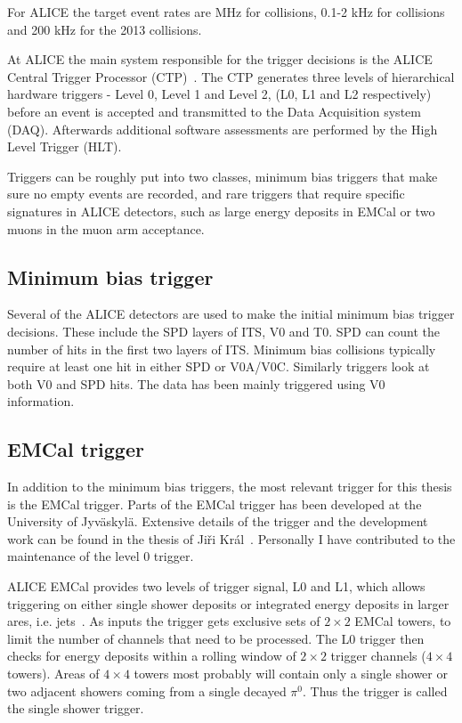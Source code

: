 For ALICE the target event rates are \unit[1]{MHz} for \pp collisions, 0.1-2 \unit{kHz} for \PbPb collisions and 200 \unit{kHz} for the 2013 \pPb collisions.

At ALICE the main system responsible for the trigger decisions is the ALICE Central Trigger Processor (CTP)~\cite{Krivda:2016myl}. The CTP generates three levels of hierarchical hardware triggers - Level 0, Level 1 and Level 2, (L0, L1 and L2 respectively) before an event is accepted and transmitted to the Data Acquisition system (DAQ). Afterwards additional software assessments are performed by the High Level Trigger (HLT).

Triggers can be roughly put into two classes, minimum bias triggers that make sure no empty events are recorded, and rare triggers that require specific signatures in ALICE detectors, such as large energy deposits in EMCal or two muons in the muon arm acceptance.

\subsection*{Minimum bias trigger}
Several of the ALICE detectors are used to make the initial minimum bias trigger decisions. These include the SPD layers of ITS, V0 and T0. SPD can count the number of hits in the first two layers of ITS. Minimum bias \pp collisions typically require at least one hit in either SPD or V0A/V0C. Similarly \PbPb triggers look at both V0 and SPD hits. The \pPb data has been mainly triggered using V0 information.


\subsection*{EMCal trigger}
In addition to the minimum bias triggers, the most relevant trigger for this thesis is the EMCal trigger. Parts of the EMCal trigger has been developed at the University of Jyväskylä. Extensive details of the trigger and the development work can be found in the thesis of Ji\v ri Král~\cite{JiriThesis}. Personally I have contributed to the maintenance of the level 0 trigger.

ALICE EMCal provides two levels of trigger signal, L0 and L1, which allows triggering on either single shower deposits or integrated energy deposits in larger ares, i.e. jets~\cite{KRAL2012261}. As inputs the trigger gets exclusive sets of $2\times2$ EMCal towers, to limit the number of channels that need to be processed. The L0 trigger then checks for energy deposits within a rolling window of $2\times2$ trigger channels ($4\times4$ towers). Areas of $4\times4$ towers most probably will contain only a single shower or two adjacent showers coming from a single decayed $\pi^0$. Thus the trigger is called the single shower trigger. 

